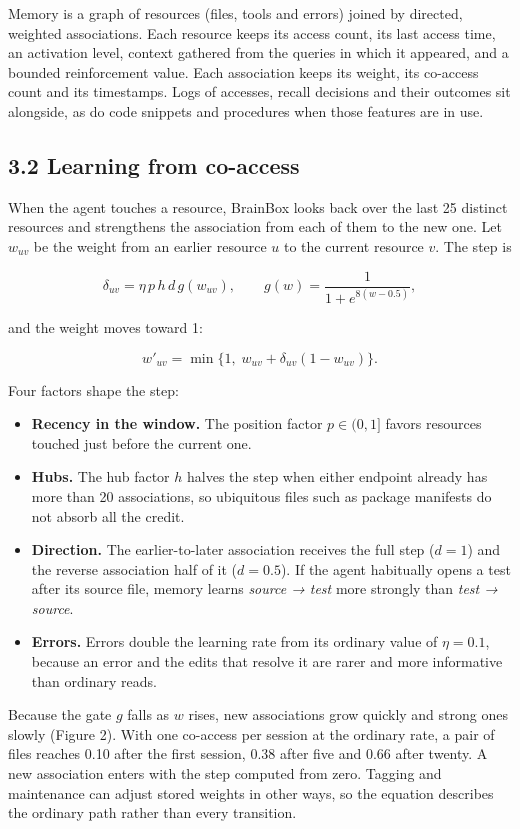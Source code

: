 \documentclass[
  american,
  11pt,
]{article}
\providecommand{\tightlist}{%
  \setlength{\itemsep}{0pt}\setlength{\parskip}{0pt}}
\begin{document}
Memory is a graph of resources (files, tools and errors) joined by directed, weighted associations. Each
resource keeps its access count, its last access time, an activation level, context gathered from the queries
in which it appeared, and a bounded reinforcement value. Each association keeps its weight, its co-access
count and its timestamps. Logs of accesses, recall decisions and their outcomes sit alongside, as do code
snippets and procedures when those features are in use.

\subsection{3.2 Learning from co-access}\label{learning-from-co-access}

When the agent touches a resource, BrainBox looks back over the last 25 distinct resources and strengthens the
association from each of them to the new one. Let \(w_{uv}\) be the weight from an earlier resource \(u\) to
the current resource \(v\). The step is

\[
\delta_{uv}=\eta\,p\,h\,d\,g(w_{uv}),\qquad g(w)=\frac{1}{1+e^{8(w-0.5)}},
\]

and the weight moves toward 1:

\[
w'_{uv}=\min\{1,\;w_{uv}+\delta_{uv}(1-w_{uv})\}.
\]

Four factors shape the step:

\begin{itemize}
\tightlist
\item
  \textbf{Recency in the window.} The position factor \(p\in(0,1]\) favors resources touched just before the
  current one.
\item
  \textbf{Hubs.} The hub factor \(h\) halves the step when either endpoint already has more than 20
  associations, so ubiquitous files such as package manifests do not absorb all the credit.
\item
  \textbf{Direction.} The earlier-to-later association receives the full step (\(d=1\)) and the reverse
  association half of it (\(d=0.5\)). If the agent habitually opens a test after its source file, memory
  learns \emph{source → test} more strongly than \emph{test → source}.
\item
  \textbf{Errors.} Errors double the learning rate from its ordinary value of \(\eta=0.1\), because an error
  and the edits that resolve it are rarer and more informative than ordinary reads.
\end{itemize}

Because the gate \(g\) falls as \(w\) rises, new associations grow quickly and strong ones slowly (Figure 2).
With one co-access per session at the ordinary rate, a pair of files reaches 0.10 after the first session,
0.38 after five and 0.66 after twenty. A new association enters with the step computed from zero. Tagging and
maintenance can adjust stored weights in other ways, so the equation describes the ordinary path rather than
every transition.
\end{document}
